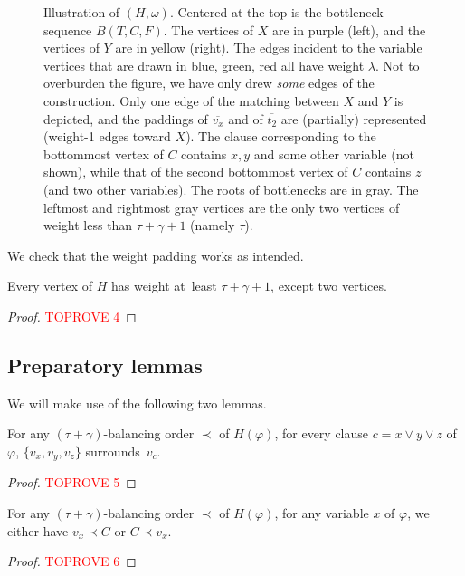 \documentclass[a4paper,UKenglish,cleveref,hyperref,autoref]{lipics-v2021}
\begin{document}
\begin{figure}[h!]
{
}
\caption{Illustration of $(H, \omega)$.
  Centered at the top is the bottleneck sequence $B(T, C, F)$.
  The vertices of $X$ are in purple (left), and the vertices of $Y$ are in yellow (right).
  The edges incident to the variable vertices that are drawn in blue, green, red all have weight $\lambda$.
  Not to overburden the figure, we have only drew \emph{some} edges of the construction.
  Only one edge of the matching between $X$ and $Y$ is depicted, and the paddings of $\overline{v_x}$ and of $\overline{t_2}$ are (partially) represented (weight-1 edges toward $X$).
  The clause corresponding to the bottommost vertex of $C$ contains $x, y$ and some other variable (not shown), while that of the second bottommost vertex of $C$ contains $z$ (and two other variables).
  The roots of bottlenecks are in gray.
  The leftmost and rightmost gray vertices are the only two vertices of weight less than $\tau+\gamma+1$ (namely $\tau$).
 }
\label{fig:first-red}
\end{figure}

\medskip

We check that the weight padding works as intended.

\begin{lemma}\label{lem:saturation}
Every vertex of $H$ has weight at~least $\tau + \gamma + 1$, except two vertices.
\end{lemma}
\begin{proof}\textcolor{red}{TOPROVE 4}\end{proof}

\subsection{Preparatory lemmas}

We will make use of the following two lemmas.

\begin{lemma}\label{lem:clause-surrounding}
For any $(\tau + \gamma)$-balancing order $\prec$ of $H(\varphi)$, for every clause $c = x \lor y \lor z$ of~$\varphi$, $\{v_x, v_y, v_z\}$ surrounds~$v_c$.
\end{lemma}
\begin{proof}\textcolor{red}{TOPROVE 5}\end{proof}

\begin{lemma}\label{lem:well-defined-order}
For any $(\tau+\gamma)$-balancing order $\prec$ of $H(\varphi)$, for any variable $x$ of $\varphi$, we either have $v_x \prec C$ or $C \prec v_x$. 
\end{lemma}
\begin{proof}\textcolor{red}{TOPROVE 6}\end{proof}
\end{document}
